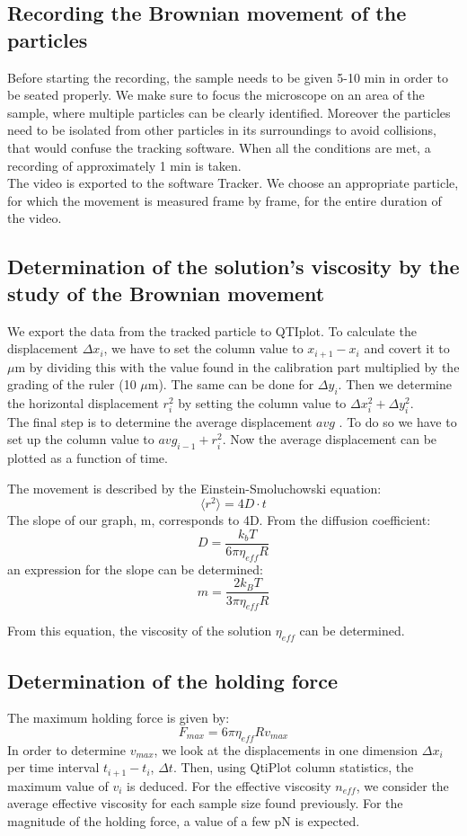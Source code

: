 \documentclass{article}
\begin{document}
\subsection{Recording the Brownian movement of the particles}
Before starting the recording, the sample needs to be given 5-10 min in order to be seated properly. We make sure to focus the microscope on an area of the sample, where multiple particles can be clearly identified. Moreover the particles need to be isolated from other particles in its surroundings to avoid collisions, that would confuse the tracking software. When all the conditions are met, a recording of approximately 1 min is taken.\\
The video is exported to the software Tracker. We choose an appropriate particle, for which the movement is measured frame by frame, for the entire duration of the video. 

\subsection{Determination of the solution's viscosity by the study of the Brownian movement}
We export the data from the tracked particle to QTIplot. To calculate the displacement $\Delta x_i$, we have to set the column value to $x_{i+1} - x_i$ and covert it to $\mu$m by dividing this with the value found in the calibration part multiplied by the grading of the ruler (10 $\mu$m). The same can be done for $\Delta y_i$. Then we determine the horizontal displacement $r_i^2$ by setting the column value to $\Delta x_i^2 + \Delta y_i^2$.\\
The final step is to determine the average displacement $avg$ . To do so we have to set up the column value to $avg_{i-1}+r_i^2$. Now the average displacement can be plotted as a function of time. 

The movement is described by the Einstein-Smoluchowski equation:
\[\langle r^2\rangle=4D\cdot t\]
The slope of our graph, m, corresponds to 4D.
From the diffusion coefficient:
\[D=\frac{k_bT}{6\pi\eta_{eff}R}\]
an expression for the slope can be determined:
\begin{equation}
    m=\frac{2k_BT}{3\pi\eta_{eff}R}
    \label{equation_viscosity}
\end{equation}

From this equation, the viscosity of the solution $\eta_{eff}$ can be determined.

\subsection{Determination of the holding force}
The maximum holding force is given by:
\begin{equation}
    F_{max}=6\pi\eta_{eff}Rv_{max}
    \label{equ:force}
\end{equation}
In order to determine $v_{max}$, we look at the displacements in one dimension $\Delta x_i$ per time interval $t_{i+1}-t_{i}$, $\Delta t$. Then, using QtiPlot column statistics, the maximum value of $v_i$ is deduced. For the effective viscosity $n_{eff}$, we consider the average effective viscosity for each sample size found previously. For the magnitude of the holding force, a value of a few pN is expected.
\end{document}
